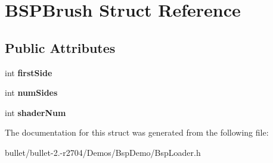 \hypertarget{struct_b_s_p_brush}{\section{B\+S\+P\+Brush Struct Reference}
\label{struct_b_s_p_brush}
}
\subsection*{Public Attributes}
\begin{DoxyCompactItemize}
\item 
\hypertarget{struct_b_s_p_brush_a8667e224314ec06b2b8fa99210528938}{int {\bfseries first\+Side}}\label{struct_b_s_p_brush_a8667e224314ec06b2b8fa99210528938}

\item 
\hypertarget{struct_b_s_p_brush_adb31de8b7724ec53ea5b710dc5f44d3e}{int {\bfseries num\+Sides}}\label{struct_b_s_p_brush_adb31de8b7724ec53ea5b710dc5f44d3e}

\item 
\hypertarget{struct_b_s_p_brush_a77df9ef2bd33fb53ed84558b6ea85627}{int {\bfseries shader\+Num}}\label{struct_b_s_p_brush_a77df9ef2bd33fb53ed84558b6ea85627}

\end{DoxyCompactItemize}


The documentation for this struct was generated from the following file\+:\begin{DoxyCompactItemize}
\item 
bullet/bullet-\/2.-\/r2704/\+Demos/\+Bsp\+Demo/Bsp\+Loader.\+h\end{DoxyCompactItemize}
